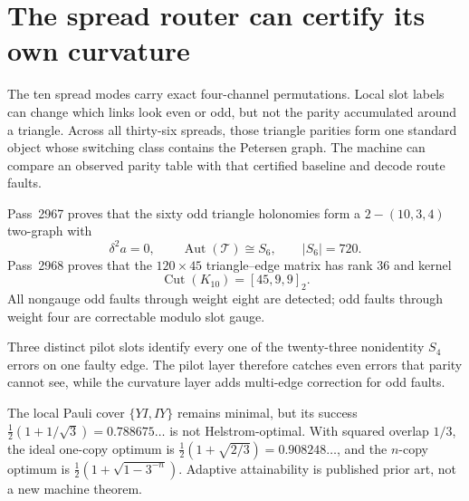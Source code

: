 \section{The spread router can certify its own curvature}
\label{sec:bt2967-bt2970-blueprint}

\begin{plain}
The ten spread modes carry exact four-channel permutations.  Local slot labels
can change which links look even or odd, but not the parity accumulated around
a triangle.  Across all thirty-six spreads, those triangle parities form one
standard object whose switching class contains the Petersen graph.  The machine
can compare an observed parity table with that certified baseline and decode
route faults.
\end{plain}

\begin{spec}
Pass~2967 proves that the sixty odd triangle holonomies form a
\(2-(10,3,4)\) two-graph with
\[
 \delta^2a=0,
 \qquad
 \operatorname{Aut}(\mathcal T)\cong S_6,
 \qquad |S_6|=720.
\]
Pass~2968 proves that the \(120\times45\) triangle--edge matrix has rank \(36\)
and kernel
\[
 \operatorname{Cut}(K_{10})=[45,9,9]_2.
\]
All nongauge odd faults through weight eight are detected; odd faults through
weight four are correctable modulo slot gauge.
\end{spec}

\begin{spec}
Three distinct pilot slots identify every one of the twenty-three nonidentity
\(S_4\) errors on one faulty edge.  The pilot layer therefore catches even
errors that parity cannot see, while the curvature layer adds multi-edge
correction for odd faults.
\end{spec}

\begin{gotwrong}
The local Pauli cover \(\{YI,IY\}\) remains minimal, but its success
\(\tfrac12(1+1/\sqrt3)=0.788675\ldots\) is not Helstrom-optimal.  With squared
overlap \(1/3\), the ideal one-copy optimum is
\(\tfrac12(1+\sqrt{2/3})=0.908248\ldots\), and the \(n\)-copy optimum is
\(\tfrac12(1+\sqrt{1-3^{-n}})\).  Adaptive attainability is published prior
art, not a new machine theorem.
\end{gotwrong}
